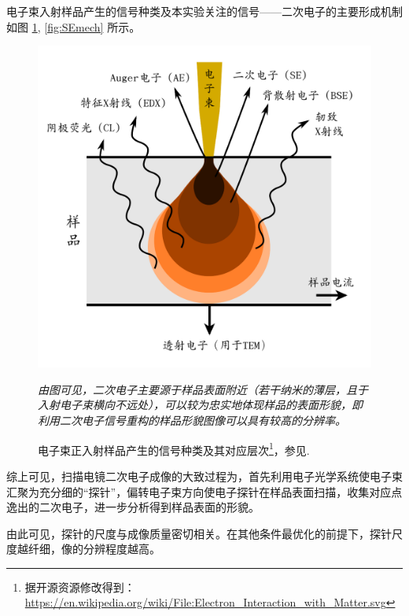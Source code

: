 \documentclass[aps,pre,12pt,preprint,%
	onecolumn,showpacs,showkeys,nofootinbib]{revtex4-1}
\begin{document}
	电子束入射样品产生的信号种类及本实验关注的信号——二次电子的主要形成机制如图 \ref{fig:outputSignal}, \ref{fig:SEmech} 所示。
	\begin{figure}[!h]
	\vspace{-3.5ex}
	\includegraphics[width=.72\linewidth]{outputSignal.pdf}\vspace{-1.5ex}
	\caption[输出信号]{电子束正入射样品产生的信号种类及其对应层次\footnote{%
		据开源资源修改得到：
		\url{https://en.wikipedia.org/wiki/File:Electron_Interaction_with_Matter.svg}
	}，参见\cite{textbook}. }\vspace{1ex}
	\raggedright\small
	\textit{\hphantom{说明}%
		由图可见，二次电子主要源于样品表面附近（若干纳米的薄层，且于入射电子束横向不远处），可以较为忠实地体现样品的表面形貌，即利用二次电子信号重构的样品形貌图像可以具有较高的分辨率。
	\vspace{1ex}}
	\label{fig:outputSignal}
	\end{figure}\FloatBarrier
	
	综上可见，扫描电镜二次电子成像的大致过程为，首先利用电子光学系统使电子束汇聚为充分细的“探针”，偏转电子束方向使电子探针在样品表面扫描，收集对应点逸出的二次电子，进一步分析得到样品表面的形貌。
	
	由此可见，探针的尺度与成像质量密切相关。在其他条件最优化的前提下，探针尺度越纤细，像的分辨程度越高。
	
\end{document}
